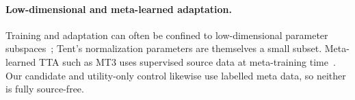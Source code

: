 \paragraph{Low-dimensional and meta-learned adaptation.} Training and adaptation can often be confined to
low-dimensional parameter subspaces~\citep{li2018intrinsic,gurari2018tiny}; Tent's normalization parameters
are themselves a small subset. Meta-learned TTA such as MT3 uses supervised source data at meta-training
time~\citep{bartler2022mt3}. Our candidate and utility-only control likewise use labelled meta data, so
neither is fully source-free.
